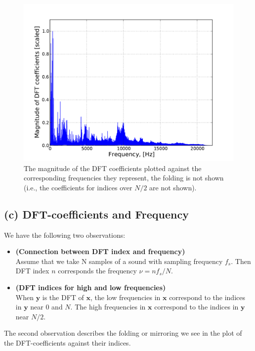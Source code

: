 \documentclass[a4paper, 11pt, notitlepage, english]{article}
\newcommand{\bt}[1]{\boldsymbol{#1}}
\begin{document}
\begin{figure}[p]
\centering
\includegraphics[width=\textwidth]{DFT_coeffs}
\caption{The magnitude of the DFT coefficients plotted against the corresponding frequencies they represent, the folding is not shown (i.e., the coefficients for indices over $N/2$ are not shown).}
\end{figure}

\clearpage

\subsection*{(c) DFT-coefficients and Frequency}

We have the following two observations:

\begin{itemize}
    \item \textbf{(Connection between DFT index and frequency)} \\
    Assume that we take N samples of a sound with sampling frequency $f_s$. Then DFT index $n$ corresponds the frequency $\nu = nf_s/N$.
    \item \textbf{(DFT indices for high and low frequencies)} \\
    When $\bt{y}$ is the DFT of $\bt{x}$, the low frequencies in $\bt{x}$ correspond to the indices in $\bt{y}$ near $0$ and $N$. The high frequencies in $\bt{x}$ correspond to the indices in $\bt{y}$ near $N/2$.
\end{itemize}

The second observation describes the folding or mirroring we see in the plot of the DFT-coefficients against their indices.
\end{document}
